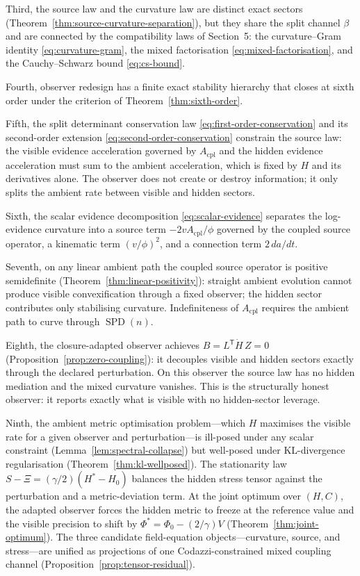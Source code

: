 \documentclass[11pt,a4paper]{article}
\numberwithin{equation}{section}
\theoremstyle{thmcompact}
\theoremstyle{remark}
\begin{document}
Third, the source law and the curvature law are distinct exact sectors (Theorem~\ref{thm:source-curvature-separation}), but they share the split channel $\beta$ and are connected by the compatibility laws of Section~5: the curvature--Gram identity \eqref{eq:curvature-gram}, the mixed factorisation \eqref{eq:mixed-factorisation}, and the Cauchy--Schwarz bound \eqref{eq:cs-bound}.

Fourth, observer redesign has a finite exact stability hierarchy that closes at sixth order under the criterion of Theorem~\ref{thm:sixth-order}.

Fifth, the split determinant conservation law \eqref{eq:first-order-conservation} and its second-order extension \eqref{eq:second-order-conservation} constrain the source law: the visible evidence acceleration governed by $A_{\mathrm{cpl}}$ and the hidden evidence acceleration must sum to the ambient acceleration, which is fixed by $H$ and its derivatives alone. The observer does not create or destroy information; it only splits the ambient rate between visible and hidden sectors.

Sixth, the scalar evidence decomposition \eqref{eq:scalar-evidence} separates the log-evidence curvature into a source term $-2vA_{\mathrm{cpl}}/\phi$ governed by the coupled source operator, a kinematic term $(v/\phi)^2$, and a connection term $2\,da/dt$.

Seventh, on any linear ambient path the coupled source operator is positive semidefinite (Theorem~\ref{thm:linear-positivity}): straight ambient evolution cannot produce visible convexification through a fixed observer; the hidden sector contributes only stabilising curvature. Indefiniteness of $A_{\mathrm{cpl}}$ requires the ambient path to curve through $\operatorname{SPD}(n)$.

Eighth, the closure-adapted observer achieves $B=L^{\mathsf T}\dot H\,Z=0$ (Proposition~\ref{prop:zero-coupling}): it decouples visible and hidden sectors exactly through the declared perturbation. On this observer the source law has no hidden mediation and the mixed curvature vanishes. This is the structurally honest observer: it reports exactly what is visible with no hidden-sector leverage.

Ninth, the ambient metric optimisation problem---which $H$ maximises the visible rate for a given observer and perturbation---is ill-posed under any scalar constraint (Lemma~\ref{lem:spectral-collapse}) but well-posed under KL-divergence regularisation (Theorem~\ref{thm:kl-wellposed}).  The stationarity law $S-\Xi=(\gamma/2)(H^*-H_0)$ balances the hidden stress tensor against the perturbation and a metric-deviation term.  At the joint optimum over $(H,C)$, the adapted observer forces the hidden metric to freeze at the reference value and the visible precision to shift by $\Phi^*=\Phi_0-(2/\gamma)V$ (Theorem~\ref{thm:joint-optimum}).  The three candidate field-equation objects---curvature, source, and stress---are unified as projections of one Codazzi-constrained mixed coupling channel (Proposition~\ref{prop:tensor-residual}).
\end{document}
